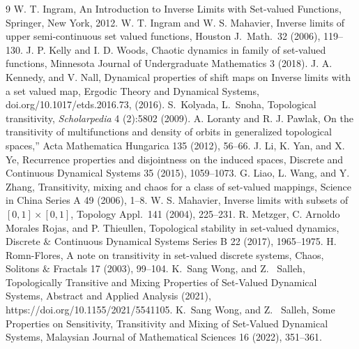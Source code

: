 \documentclass[a4paper,12pt]{article} %
\begin{document}
\begin{thebibliography}{9}
	 W. T. Ingram,  An Introduction to Inverse Limits with Set-valued Functions, 	  Springer, New York, 2012.	
  W. T. Ingram and W. S. Mahavier, Inverse limits of
upper semi-continuous set valued functions,  Houston J.\ Math.\ 32
(2006), 119--130.
 J. P. Kelly and I. D. Woods, Chaotic dynamics in family of set-valued functions, Minnesota Journal of Undergraduate Mathematics 3 (2018).
  J. A. Kennedy, and V. Nall,  Dynamical properties of shift maps on Inverse limits with a set valued map, Ergodic Theory and Dynamical Systems,  doi.org/10.1017/etds.2016.73, (2016).
 S.~Kolyada, L.~Snoha,  Topological transitivity, \textit{Scholarpedia}  4 (2):5802 (2009).
 A. Loranty and R. J. Pawlak, On the transitivity of multifunctions and density of orbits in generalized topological spaces,” Acta Mathematica Hungarica 135 (2012),  56--66.
 J. Li, K. Yan, and X. Ye, Recurrence properties and disjointness on the induced spaces, Discrete and Continuous Dynamical Systems 35 (2015),   1059--1073.
  G. Liao, L. Wang, and Y. Zhang,  Transitivity, mixing and chaos for a class of set-valued mappings, Science in China Series A 49 (2006),   1--8.
  W. S. Mahavier, Inverse limits with subsets of $[0,1]\times [0,1]$,  Topology Appl.\ 141 (2004), 225--231.
 R. Metzger, C. Arnoldo Morales Rojas, and P. Thieullen, Topological stability in set-valued dynamics, Discrete $\&$ Continuous Dynamical Systems Series B 22 (2017), 1965--1975.
 H. Romn-Flores, A note on transitivity in set-valued discrete systems, Chaos, Solitons $\&$ Fractals 17 (2003),  99--104.
 K.~Sang Wong, and Z. ~Salleh, Topologically Transitive and Mixing Properties of Set-Valued Dynamical Systems, Abstract and Applied Analysis (2021), https://doi.org/10.1155/2021/5541105. 
 K.~Sang Wong, and Z. ~Salleh, Some Properties on Sensitivity, Transitivity and Mixing of Set-Valued Dynamical Systems, Malaysian Journal of Mathematical Sciences 16 (2022), 351--361.
\end{thebibliography}
\end{document}
